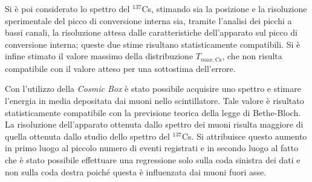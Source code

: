 Si è poi considerato lo spettro del ${}^{137}$Cs, stimando sia la posizione e la risoluzione sperimentale del picco di conversione interna sia, tramite l'analisi dei picchi a bassi canali, la risoluzione attesa dalle caratteristiche dell'apparato sul picco di conversione interna; queste due stime risultano statisticamente compatibili. Si è infine stimato il valore massimo della distribuzione $T_{max,\text{Cs}}$, che non risulta compatibile con il valore atteso per una sottostima dell'errore.

Con l'utilizzo della \textit{Cosmic Box} è stato possibile acquisire uno spettro e stimare l'energia in media depositata dai muoni nello scintillatore. 
Tale valore è risultato statisticamente compatibile con la previsione teorica della legge di Bethe-Bloch. La risoluzione dell'apparato ottenuta dallo spettro dei muoni risulta maggiore di quella ottenuta dallo studio dello spettro del ${}^{137}$Cs. Si attribuisce questo aumento in primo luogo al piccolo numero di eventi registrati e in secondo luogo al fatto che è stato possibile effettuare una regressione solo sulla coda sinistra dei dati e non sulla coda destra poiché questa è influenzata dai muoni fuori asse.
